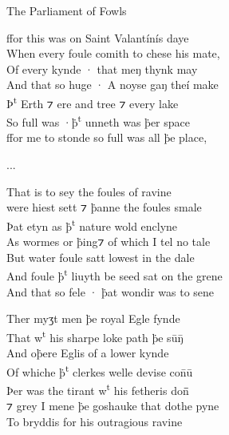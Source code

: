 \begin{texts}{The Parliament of Fowls}
\begin{textglossed}
ffor this was on Saint Valantínís daye\\
When every foule comith to chese his mate,\\
Of every kynde · that meŋ thynk may\\
And that so huge · A noyse gaŋ theí make\\
Þ\textsuperscript{t} Erth ⁊ ere and tree ⁊ every lake\\
So full was ·\.{þ}\textsuperscript{t} unneth was \.{þ}er space\\
ffor me to stonde so full was all \.{þ}e place,

...

That is to sey the foules of ravine\\
were hiest sett ⁊ \.{þ}anne the foules smale\\
Þat etyn as \.{þ}\textsuperscript{t} nature wold enclyne\\
As wormes or \.{þ}ing⁊ of which I tel no tale\\
But water foule satt lowest in the dale\\
And foule \.{þ}\textsuperscript{t} liuyth be seed sat on the grene\\
And that so fele · \.{þ}at wondir was to sene
 
Ther myʒt men \.{þ}e royal Egle fynde\\
That w\textsuperscript{t} his sharpe loke path \.{þ}e sūŋ̄\\
And o\.{þ}ere Eglis of a lower kynde\\
Of whiche \.{þ}\textsuperscript{t} clerkes welle devise con̄ū\\
Þer was the tirant w\textsuperscript{t} his fetheris don̄̄\\
⁊ grey I mene \.{þ}e goshauke that dothe pyne\\
To bryddis for his outragious ravine


\end{textglossed}
\end{texts}
